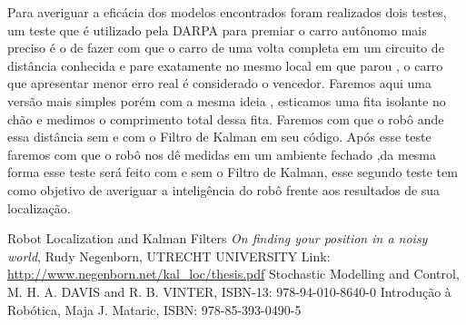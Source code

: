 \documentclass[11pt]{article}
\begin{document}
Para averiguar a eficácia dos modelos encontrados foram realizados dois testes, um teste que é utilizado pela DARPA para premiar o carro autônomo mais preciso é o de fazer com que o carro de uma volta completa em um circuito de distância conhecida e pare exatamente no mesmo local em que parou , o carro que apresentar menor erro real é considerado o vencedor. Faremos aqui uma versão mais simples porém com a mesma ideia , esticamos uma fita isolante no chão e medimos  o comprimento total dessa fita. Faremos com que o robô ande essa distância sem e com o Filtro de Kalman em seu código. Após esse teste faremos com que o robô nos dê medidas em um ambiente fechado ,da mesma forma esse teste será feito com e sem o Filtro de Kalman, esse segundo teste tem como objetivo de averiguar a inteligência do robô frente aos resultados de sua localização.
\begin{thebibliography}{9}
Robot Localization and Kalman Filters \textit{On finding your position in a noisy world}, Rudy Negenborn,
UTRECHT UNIVERSITY
Link: \url{http://www.negenborn.net/kal_loc/thesis.pdf}
Stochastic Modelling and Control,
M. H. A. DAVIS and R. B. VINTER,
ISBN-13: 978-94-010-8640-0
Introdução à Robótica,
Maja J. Mataric,
ISBN: 978-85-393-0490-5
\end{thebibliography}
\end{document}
